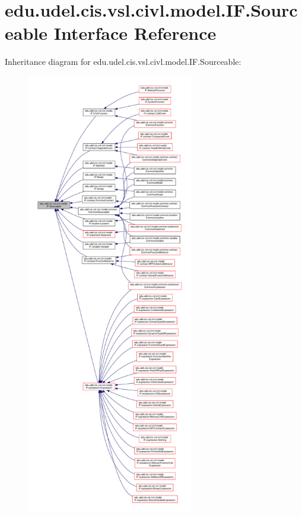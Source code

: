 \hypertarget{interfaceedu_1_1udel_1_1cis_1_1vsl_1_1civl_1_1model_1_1IF_1_1Sourceable}{}\section{edu.\+udel.\+cis.\+vsl.\+civl.\+model.\+I\+F.\+Sourceable Interface Reference}
\label{interfaceedu_1_1udel_1_1cis_1_1vsl_1_1civl_1_1model_1_1IF_1_1Sourceable}


Inheritance diagram for edu.\+udel.\+cis.\+vsl.\+civl.\+model.\+I\+F.\+Sourceable\+:
\nopagebreak
\begin{figure}[H]
\begin{center}
\leavevmode
\includegraphics[height=550pt]{interfaceedu_1_1udel_1_1cis_1_1vsl_1_1civl_1_1model_1_1IF_1_1Sourceable__inherit__graph}
\end{center}
\end{figure}
